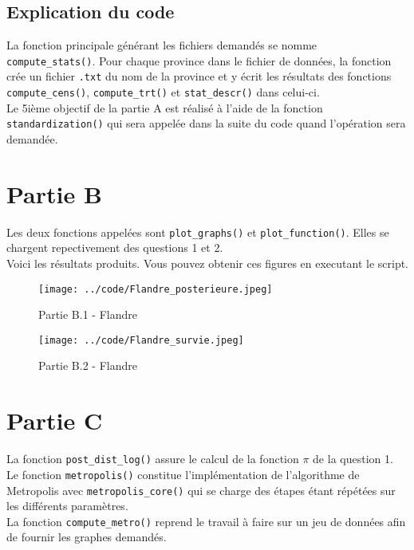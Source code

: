 \documentclass{article}
\begin{document}
\subsection{Explication du code}
La fonction principale générant les fichiers demandés se nomme \texttt{compute\_stats()}. Pour chaque province dans le fichier de données, la fonction crée un fichier \texttt{.txt} du nom de la province et y écrit les résultats des fonctions \texttt{compute\_cens()}, \texttt{compute\_trt()} et \texttt{stat\_descr()} dans celui-ci. \\
Le 5ième objectif de la partie A est réalisé à l'aide de la fonction \texttt{standardization()} qui sera appelée dans la suite du code quand l'opération sera demandée.

\section{Partie B}
Les deux fonctions appelées sont \texttt{plot\_graphs()} et \texttt{plot\_function()}. Elles se chargent repectivement des questions 1 et 2.\\
Voici les résultats produits. Vous pouvez obtenir ces figures en executant le script.

\begin{figure}[!h]
   \begin{minipage}[c]{.46\linewidth}
	\texttt{[image: ../code/Flandre\_posterieure.jpeg]}
	\caption{Partie B.1 - Flandre}
   \end{minipage} \hfill
   \begin{minipage}[c]{.46\linewidth}
	\texttt{[image: ../code/Flandre\_survie.jpeg]}
	\caption{Partie B.2 - Flandre}
   \end{minipage}
\end{figure}

\section{Partie C}
La fonction \texttt{post\_dist\_log()} assure le calcul de la fonction $\pi$ de la question 1. Le fonction \texttt{metropolis()} constitue l'implémentation de l'algorithme de Metropolis avec \texttt{metropolis\_core()} qui se charge des étapes étant répétées sur les différents paramètres.\\
La fonction \texttt{compute\_metro()} reprend le travail à faire sur un jeu de données afin de fournir les graphes demandés.\\
\end{document}
